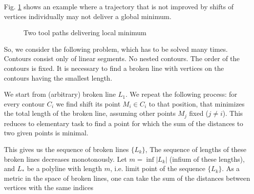 \documentclass[]{llncs}
\begin{document}
\begin{remark}
Fig. \ref{counter-example} shows an example where a trajectory
that is not improved by shifts of vertices individually
may not deliver a global minimum.

\begin{figure}
  \begin{center}
  \end{center}
  \caption{Two tool paths delivering local minimum}
  \label{counter-example}
  \end{figure}
\end{remark}

So,
we consider the following problem,
which has to be solved many times.
Contours consist only of linear segments.
No nested contours.
The order of the contours is fixed.
It is necessary to find a broken line with vertices
on the contours
having the smallest length.

We start from
(arbitrary)
broken line
$L_1$.
We repeat the following process:
for every contour
$C_i$
we find shift its point
$M_i \in C_i$
to that position,
that minimizes the total
length of the broken line,
assuming other points
$M_j$ fixed
($j \ne i$).
This reduces to elementary task
to find a point for which
the sum of the distances to two given points is minimal.

This gives us
the sequence of broken lines
$\{L_k\}$,
The sequence of lengths of these broken lines
decreases monotonously.
Let
$m = \inf |L_k|$
(infium of these lengths),
and
$L_*$ be a polyline with length $m$,
i.e. limit point of the sequence
$\{L_k\}$.
As a metric in the space of broken lines,
one can take the sum of the distances
between vertices with the same indices
\end{document}
